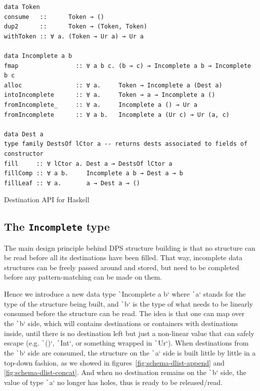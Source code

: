 \documentclass[english]{jflart}
\begin{document}
\begin{table}[t]
\small
\begin{verbatim}
data Token
consume   ::      Token ⊸ ()
dup2      ::      Token ⊸ (Token, Token)
withToken :: ∀ a. (Token ⊸ Ur a) ⊸ Ur a

data Incomplete a b
fmap                :: ∀ a b c. (b ⊸ c) ⊸ Incomplete a b ⊸ Incomplete b c
alloc               :: ∀ a.     Token ⊸ Incomplete a (Dest a)
intoIncomplete      :: ∀ a.     Token ⊸ a → Incomplete a ()
fromIncomplete_     :: ∀ a.     Incomplete a () ⊸ Ur a
fromIncomplete      :: ∀ a b.   Incomplete a (Ur c) ⊸ Ur (a, c)

data Dest a
type family DestsOf lCtor a -- returns dests associated to fields of constructor
fill     :: ∀ lCtor a. Dest a ⊸ DestsOf lCtor a
fillComp :: ∀ a b.     Incomplete a b ⊸ Dest a ⊸ b
fillLeaf :: ∀ a.       a → Dest a ⊸ ()
\end{verbatim}
\caption{Destination API for Haskell}
\label{table:destination-api}
\end{table}

\subsection{The \texttt{Incomplete} type}

The main design principle behind DPS structure building is that no structure can be read before all its destinations have been filled. That way, incomplete data structures can be freely passed around and stored, but need to be completed before any pattern-matching can be made on them.

Hence we introduce a new data type \texttt`Incomplete a b` where \texttt`a` stands for the type of the structure being built, and \texttt`b` is the type of what needs to be linearly consumed before the structure can be read. The idea is that one can map over the \texttt`b` side, which will contains destinations or containers with destinations inside, until there is no destination left but just a non-linear value that can safely escape (e.g. \texttt`()`, \texttt`Int`, or something wrapped in \texttt`Ur`). When destinations from the \texttt`b` side are consumed, the structure on the \texttt`a` side is built little by little in a top-down fashion, as we showed in figures~\ref{fig:schema-dlist-append} and \ref{fig:schema-dlist-concat}. And when no destination remains on the \texttt`b` side, the value of type \texttt`a` no longer has holes, thus is ready to be released/read.
\end{document}
